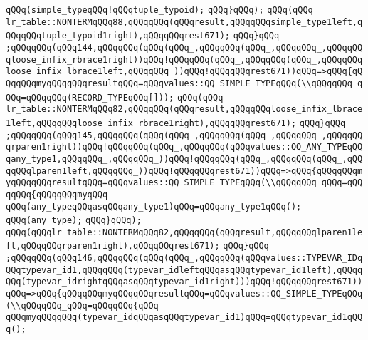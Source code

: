 \verb|qQQq(simple_typeqQQq!qQQqtuple_typoid);|\newline
\verb|qQQq}qQQq);|\newline
\verb|qQQq(qQQq|\newline
\verb|lr_table::NONTERMqQQq88,qQQqqQQq(qQQqresult,qQQqqQQqsimple_type1left,qQQqqQQqtuple_typoid1right),qQQqqQQqrest671);|\newline
\verb|qQQq}qQQq|\newline
\verb|;qQQqqQQq(qQQq144,qQQqqQQq(qQQq(qQQq_,qQQqqQQq(qQQq_,qQQqqQQq_,qQQqqQQqloose_infix_rbrace1right))qQQq!qQQqqQQq(qQQq_,qQQqqQQq(qQQq_,qQQqqQQqloose_infix_lbrace1left,qQQqqQQq_))qQQq!qQQqqQQqrest671))qQQq=>qQQq{qQQqqQQqmyqQQqqQQqresultqQQq=qQQqvalues::QQ_SIMPLE_TYPEqQQq(\\qQQqqQQq_qQQq=qQQqqQQq(RECORD_TYPEqQQq[]));|\newline
\verb|qQQq(qQQq|\newline
\verb|lr_table::NONTERMqQQq82,qQQqqQQq(qQQqresult,qQQqqQQqloose_infix_lbrace1left,qQQqqQQqloose_infix_rbrace1right),qQQqqQQqrest671);|\newline
\verb|qQQq}qQQq|\newline
\verb|;qQQqqQQq(qQQq145,qQQqqQQq(qQQq(qQQq_,qQQqqQQq(qQQq_,qQQqqQQq_,qQQqqQQqrparen1right))qQQq!qQQqqQQq(qQQq_,qQQqqQQq(qQQqvalues::QQ_ANY_TYPEqQQqany_type1,qQQqqQQq_,qQQqqQQq_))qQQq!qQQqqQQq(qQQq_,qQQqqQQq(qQQq_,qQQqqQQqlparen1left,qQQqqQQq_))qQQq!qQQqqQQqrest671))qQQq=>qQQq{qQQqqQQqmyqQQqqQQqresultqQQq=qQQqvalues::QQ_SIMPLE_TYPEqQQq(\\qQQqqQQq_qQQq=qQQqqQQq{qQQqqQQqmyqQQq|\newline
\verb|qQQq(any_typeqQQqasqQQqany_type1)qQQq=qQQqany_type1qQQq();|\newline
\verb|qQQq(any_type);|\newline
\verb|qQQq}qQQq);|\newline
\verb|qQQq(qQQqlr_table::NONTERMqQQq82,qQQqqQQq(qQQqresult,qQQqqQQqlparen1left,qQQqqQQqrparen1right),qQQqqQQqrest671);|\newline
\verb|qQQq}qQQq|\newline
\verb|;qQQqqQQq(qQQq146,qQQqqQQq(qQQq(qQQq_,qQQqqQQq(qQQqvalues::TYPEVAR_IDqQQqtypevar_id1,qQQqqQQq(typevar_idleftqQQqasqQQqtypevar_id1left),qQQqqQQq(typevar_idrightqQQqasqQQqtypevar_id1right)))qQQq!qQQqqQQqrest671))qQQq=>qQQq{qQQqqQQqmyqQQqqQQqresultqQQq=qQQqvalues::QQ_SIMPLE_TYPEqQQq(\\qQQqqQQq_qQQq=qQQqqQQq{qQQq|\newline
\verb|qQQqmyqQQqqQQq(typevar_idqQQqasqQQqtypevar_id1)qQQq=qQQqtypevar_id1qQQq();|\newline
